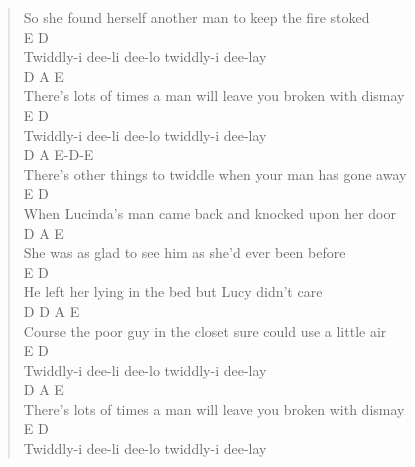 \documentclass[11pt]{article}
\begin{document}
\begin{verse}
So she found herself another man to keep the fire stoked\\
\vspace*{1em}
\vspace*{1em}
E                        D\\
Twiddly-i dee-li dee-lo twiddly-i dee-lay\\
\hspace*{9em}D                                 A           E\\
There's lots of times a man will leave you broken with dismay\\
E                         D\\
Twiddly-i dee-li dee-lo twiddly-i dee-lay\\
\hspace*{8em}D                                 A              E-D-E\\
There's other things to twiddle when your man has gone away\\
\vspace*{1em}
\vspace*{1em}
E                                D\\
When Lucinda's man came back and knocked upon her door\\
\hspace*{4em}D                               A          E\\
She was as glad to see him as she'd ever been before\\
E                                 D\\
He left her lying in the bed but Lucy didn't care\\
\hspace*{12em}D                D                A            E\\
Course the poor guy in the closet sure could use a little air\\
\vspace*{1em}
\vspace*{1em}
E                        D\\
Twiddly-i dee-li dee-lo twiddly-i dee-lay\\
\hspace*{9em}D                                 A           E\\
There's lots of times a man will leave you broken with dismay\\
E                         D\\
Twiddly-i dee-li dee-lo twiddly-i dee-lay\\

\end{verse}
\end{document}

